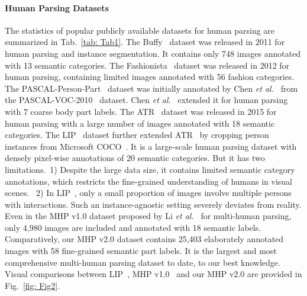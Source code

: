 \documentclass[10pt,twocolumn,letterpaper]{article}
\theoremstyle{definition}
\theoremstyle{remark}
\begin{document}
\paragraph{Human Parsing Datasets} The statistics of popular publicly available datasets for human parsing are summarized in Tab.~\ref{tab: Tab1}. The Buffy~\cite{vineet2011human} dataset was released in 2011 for human parsing and instance segmentation. It  contains only 748 images annotated with 13 semantic categories. The Fashionista~\cite{yamaguchi2012parsing} dataset was released in 2012 for human parsing, containing limited images annotated with 56 fashion categories. The PASCAL-Person-Part~\cite{chen2014detect} dataset was initially annotated by Chen \emph{et al.}~\cite{chen2014detect} from the PASCAL-VOC-2010~\cite{everingham2010pascal} dataset. Chen \emph{et al.}~\cite{chen2016attention} extended it for human parsing with 7 coarse body part labels. The ATR~\cite{liang2015human} dataset was released in 2015 for human parsing with a large number of images annotated with 18 semantic categories. The LIP~\cite{gong2017look} dataset further extended ATR~\cite{liang2015human} by cropping person instances from Microsoft COCO~\cite{lin2014microsoft}. It is a large-scale human parsing dataset with densely pixel-wise annotations of 20 semantic categories. But it has two limitations.~1) Despite the large data size, it contains limited semantic category annotations, which restricts the fine-grained understanding of humans in visual scenes. ~2) In LIP~\cite{gong2017look}, only a small proportion of images involve multiple persons with interactions. Such an instance-agnostic setting severely deviates from reality. Even in the MHP v1.0 dataset proposed by Li \emph{et al.}~\cite{li2017towards} for multi-human parsing, only 4{,}980 images are included and annotated with 18 semantic labels. Comparatively, our MHP v2.0 dataset contains 25{,}403 elaborately annotated images with 58 fine-grained semantic part labels. It  is the largest and most comprehensive multi-human parsing dataset to date, to our best knowledge. Visual comparisons between LIP~\cite{gong2017look}, MHP v1.0~\cite{li2017towards} and our MHP v2.0 are provided in Fig.~\ref{fig: Fig2}.

\vspace{-2mm}
\end{document}
